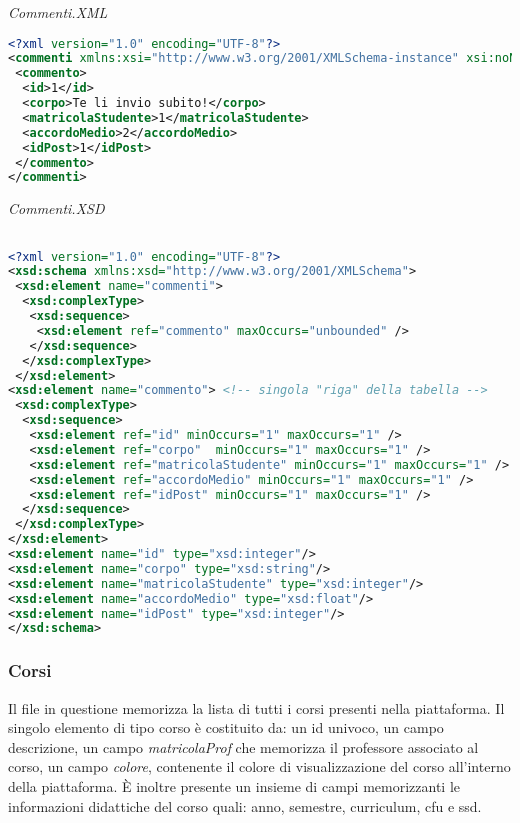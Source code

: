 \documentclass [a4paper,11pt]{book}
\begin{document}
\medskip

\emph{Commenti.XML}

\begin{lstlisting}[language=XML]
<?xml version="1.0" encoding="UTF-8"?>
<commenti xmlns:xsi="http://www.w3.org/2001/XMLSchema-instance" xsi:noNamespaceSchemaLocation="commenti.xsd">
 <commento>
  <id>1</id>
  <corpo>Te li invio subito!</corpo>
  <matricolaStudente>1</matricolaStudente>
  <accordoMedio>2</accordoMedio>
  <idPost>1</idPost>
 </commento>
</commenti>
\end{lstlisting}

\medskip

\emph{Commenti.XSD}

\begin{lstlisting}[language=XML]

<?xml version="1.0" encoding="UTF-8"?>
<xsd:schema xmlns:xsd="http://www.w3.org/2001/XMLSchema">
 <xsd:element name="commenti">
  <xsd:complexType>
   <xsd:sequence>
    <xsd:element ref="commento" maxOccurs="unbounded" />
   </xsd:sequence>
  </xsd:complexType>
 </xsd:element>
<xsd:element name="commento"> <!-- singola "riga" della tabella -->
 <xsd:complexType>
  <xsd:sequence>
   <xsd:element ref="id" minOccurs="1" maxOccurs="1" />
   <xsd:element ref="corpo"  minOccurs="1" maxOccurs="1" />
   <xsd:element ref="matricolaStudente" minOccurs="1" maxOccurs="1" />
   <xsd:element ref="accordoMedio" minOccurs="1" maxOccurs="1" />
   <xsd:element ref="idPost" minOccurs="1" maxOccurs="1" />
  </xsd:sequence>   
 </xsd:complexType>
</xsd:element>
<xsd:element name="id" type="xsd:integer"/>
<xsd:element name="corpo" type="xsd:string"/>
<xsd:element name="matricolaStudente" type="xsd:integer"/>
<xsd:element name="accordoMedio" type="xsd:float"/>
<xsd:element name="idPost" type="xsd:integer"/>
</xsd:schema>
\end{lstlisting}

\medskip

\subsubsection{Corsi}

Il file in questione memorizza la lista di tutti i corsi presenti nella piattaforma. Il singolo elemento di tipo corso è costituito da: un id univoco, un campo descrizione, un campo \emph{matricolaProf} che memorizza il professore associato al corso, un campo \emph{colore}, contenente il colore di visualizzazione del corso all'interno della piattaforma. È inoltre presente un insieme di campi memorizzanti le informazioni didattiche del corso quali: anno, semestre, curriculum, cfu e ssd.
\end{document}
